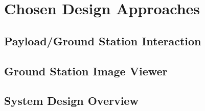 \chapter{Chosen Design Approaches}




\section{Payload/Ground Station Interaction}

\section{Ground Station Image Viewer}





\section{System Design Overview}


